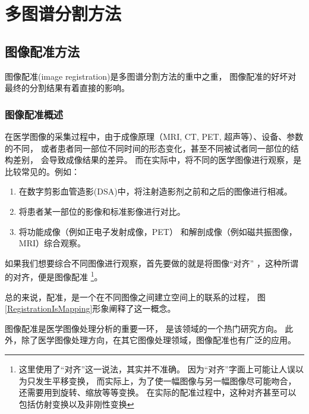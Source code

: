 
\chapter{多图谱分割方法}

\section{图像配准方法}
  图像配准(image registration)是多图谱分割方法的重中之重，
  图像配准的好坏对最终的分割结果有着直接的影响。
\subsection{图像配准概述}
在医学图像的采集过程中，由于成像原理（MRI, CT, PET, 超声等）、设备、参数的不同，
或者患者同一部位不同时间的形态变化，甚至不同被试者同一部位的结构差别，
会导致成像结果的差异。
而在实际中，将不同的医学图像进行观察，是比较常见的。例如：
\begin{enumerate}
  \item 在数字剪影血管造影(DSA)中，将注射造影剂之前和之后的图像进行相减。
  \item 将患者某一部位的影像和标准影像进行对比。
  \item 将功能成像（例如正电子发射成像，PET）%
    和解剖成像（例如磁共振图像，MRI）综合观察。
\end{enumerate}
如果我们想要综合不同图像进行观察，首先要做的就是将图像``对齐''
，这种所谓的对齐，便是图像配准
\footnote{这里使用了``对齐''这一说法，其实并不准确。
因为``对齐''字面上可能让人误以为只发生平移变换，
而实际上，为了使一幅图像与另一幅图像尽可能吻合，
还需要用到旋转、缩放等等变换。
在实际的配准过程中，这种对齐甚至可以包括仿射变换以及非刚性变换}。

总的来说，配准，是一个在不同图像之间建立空间上的联系的过程，
图\ref{RegistrationIsMapping}形象阐释了这一概念。

图像配准是医学图像处理分析的重要一环，
是该领域的一个热门研究方向。
此外，除了医学图像处理方向，在其它图像处理领域，图像配准也有广泛的应用。

